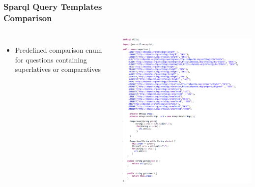 \documentclass{beamer}
\begin{document}
\begin{frame}
\frametitle{Sparql Query Templates \\ {\small Comparison}}
\begin{columns}[c] %
	
	\begin{itemize}
		\item Predefined comparison enum for questions containing superlatives or comparatives
	\end{itemize}
	
	\includegraphics[scale=0.38]{Comparison.PNG}
	
\end{columns}
\end{frame}
\end{document}
